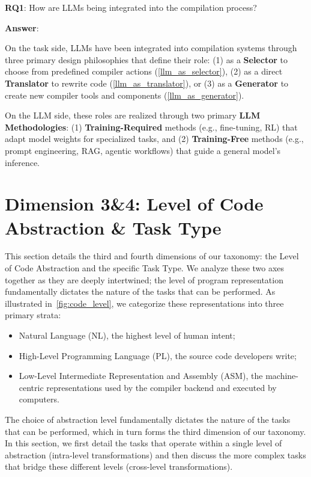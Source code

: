 \documentclass[pdflatex,sn-mathphys-ay,twocolumn, a4paper]{sn-jnl}%
\theoremstyle{thmstyleone}%
\theoremstyle{thmstyletwo}%
\theoremstyle{thmstylethree}%
\begin{document}
\begin{tcolorbox}[colback=white,colframe=black]
    \textbf{RQ1}: How are LLMs being integrated into the compilation process?

    \textbf{Answer}:
    
    On the task side, LLMs have been integrated into compilation systems through three primary design philosophies that define their role: (1) as a \textbf{Selector} to choose from predefined compiler actions (\autoref{llm_as_selector}), (2) as a direct \textbf{Translator} to rewrite code (\autoref{llm_as_translator}), or (3) as a \textbf{Generator} to create new compiler tools and components (\autoref{llm_as_generator}).
    
    On the LLM side, these roles are realized through two primary \textbf{LLM Methodologies}: (1) \textbf{Training-Required} methods (e.g., fine-tuning, RL) that adapt model weights for specialized tasks, and (2) \textbf{Training-Free} methods (e.g., prompt engineering, RAG, agentic workflows) that guide a general model's inference.

\end{tcolorbox}

\section{Dimension 3\&4: Level of Code Abstraction \& Task Type}\label{dimension2}


This section details the third and fourth dimensions of our taxonomy: the Level of Code Abstraction and the specific Task Type. We analyze these two axes together as they are deeply intertwined; the level of program representation fundamentally dictates the nature of the tasks that can be performed. As illustrated in~\autoref{fig:code_level}, we categorize these representations into three primary strata: 
\begin{itemize}
    \item Natural Language (NL), the highest level of human intent; 
    \item High-Level Programming Language (PL), the source code developers write;
    \item Low-Level Intermediate Representation and Assembly (ASM), the machine-centric representations used by the compiler backend and executed by computers.
\end{itemize}

The choice of abstraction level fundamentally dictates the nature of the tasks that can be performed, which in turn forms the third dimension of our taxonomy. In this section, we first detail the tasks that operate within a single level of abstraction (intra-level transformations) and then discuss the more complex tasks that bridge these different levels (cross-level transformations).
\end{document}
